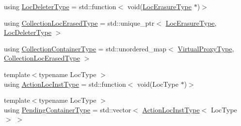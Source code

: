 \begin{DoxyCompactItemize}
\item 
using \hyperlink{structvt_1_1location_1_1_location_manager_ab0ce8907fcf9b36cf884af08c744ddb1}{Loc\+Deleter\+Type} = std\+::function$<$ void(\hyperlink{structvt_1_1location_1_1_location_manager_a0c153c55a8938e99fad5386699653220}{Loc\+Erasure\+Type} $\ast$)$>$
\item 
using \hyperlink{structvt_1_1location_1_1_location_manager_a590e246bdfa380ef31e7aee4f4d51442}{Collection\+Loc\+Erased\+Type} = std\+::unique\+\_\+ptr$<$ \hyperlink{structvt_1_1location_1_1_location_manager_a0c153c55a8938e99fad5386699653220}{Loc\+Erasure\+Type}, \hyperlink{structvt_1_1location_1_1_location_manager_ab0ce8907fcf9b36cf884af08c744ddb1}{Loc\+Deleter\+Type} $>$
\item 
using \hyperlink{structvt_1_1location_1_1_location_manager_a03472723aecf57cd99cd221ef2164edb}{Collection\+Container\+Type} = std\+::unordered\+\_\+map$<$ \hyperlink{namespacevt_a1b417dd5d684f045bb58a0ede70045ac}{Virtual\+Proxy\+Type}, \hyperlink{structvt_1_1location_1_1_location_manager_a590e246bdfa380ef31e7aee4f4d51442}{Collection\+Loc\+Erased\+Type} $>$
\item 
{\footnotesize template$<$typename Loc\+Type $>$ }\\using \hyperlink{structvt_1_1location_1_1_location_manager_a6de3841092c537efc5fb8376128bfe18}{Action\+Loc\+Inst\+Type} = std\+::function$<$ void(Loc\+Type $\ast$)$>$
\item 
{\footnotesize template$<$typename Loc\+Type $>$ }\\using \hyperlink{structvt_1_1location_1_1_location_manager_aad005a828c535232cd6b63859b25b171}{Pending\+Container\+Type} = std\+::vector$<$ \hyperlink{structvt_1_1location_1_1_location_manager_a6de3841092c537efc5fb8376128bfe18}{Action\+Loc\+Inst\+Type}$<$ Loc\+Type $>$ $>$
\end{DoxyCompactItemize}
